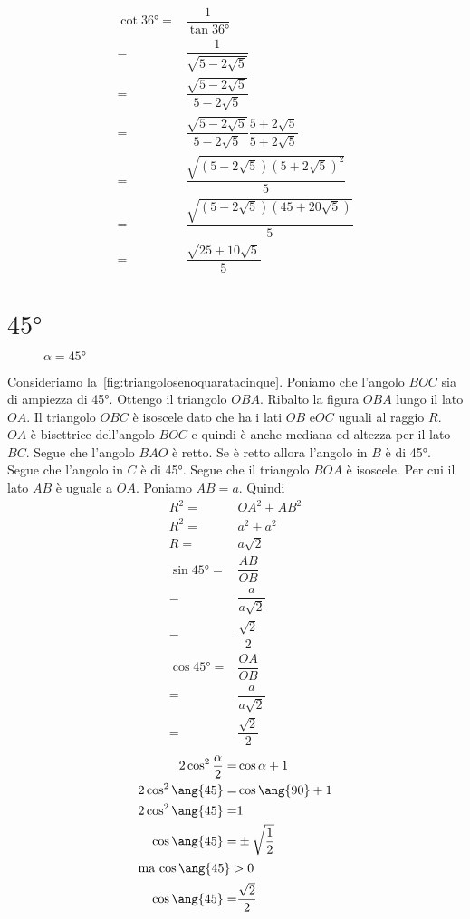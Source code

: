 \begin{align*}
	\cot\ang{36}=&\dfrac{1}{\tan\ang{36}}\\
	=&\dfrac{1}{\sqrt{5-2\sqrt{5}}}\\
	=&\dfrac{\sqrt{5-2\sqrt{5}}}{5-2\sqrt{5}}\\
	=&\dfrac{\sqrt{5-2\sqrt{5}}}{5-2\sqrt{5}}\dfrac{5+2\sqrt{5}}{5+2\sqrt{5}}\\
	=&\dfrac{\sqrt{(5-2\sqrt{5})(5+2\sqrt{5})^2}}{5}\\
	=&\dfrac{\sqrt{(5-2\sqrt{5})(45+20\sqrt{5})}}{5}\\
	=&\dfrac{\sqrt{25+10\sqrt{5}}}{5}\\
\end{align*}
\section{$\ang{45}$}
\begin{figure}
	\centering
	
	\caption{$\alpha=\ang{45}$}
	\label{fig:triangolosenoquaratacinque}
\end{figure}
Consideriamo la~\vref{fig:triangolosenoquaratacinque}. Poniamo che l'angolo $BOC$ sia di ampiezza di \ang{45}. Ottengo il triangolo $OBA$. Ribalto la figura $OBA$ lungo il lato $OA$. Il triangolo $OBC$ è isoscele dato che ha i lati $OB$ e$OC$ uguali al raggio $R$. $OA$ è bisettrice dell'angolo $BOC$ e quindi è anche mediana ed altezza per il lato $BC$. Segue che l'angolo $BAO$ è retto. Se è retto allora l'angolo in $B$ è di \ang{45}. Segue che l'angolo in $C$ è di \ang{45}. Segue che il triangolo $BOA$ è isoscele. Per cui il lato $AB$ è uguale a $OA$. Poniamo $AB=a$. Quindi
\begin{align*}
	R^2=&OA^2+AB^2\\
	R^2=&a^2+a^2\\
	R=&a\sqrt{2}\\
	\sin\ang{45}=&\dfrac{AB}{OB}\\
	=&\dfrac{a}{a\sqrt{2}}\\
	=&\dfrac{\sqrt{2}}{2}\\
	\cos\ang{45}=&\dfrac{OA}{OB}\\
	=&\dfrac{a}{a\sqrt{2}}\\
	=&\dfrac{\sqrt{2}}{2}
\end{align*} 
\begin{align*}
	2\cos^2\dfrac{\alpha}{2}=&\cos\alpha+1\\
	2\cos^2\ang{45}=&\cos\ang{90}+1\\
	2\cos^2\ang{45}=&1\\
	\cos\ang{45}=&\pm\sqrt{\dfrac{1}{2}}\\
	\intertext{ma $\cos\ang{45}>0$}
	\cos\ang{45}=&\dfrac{\sqrt{2}}{2}\\
\end{align*}
